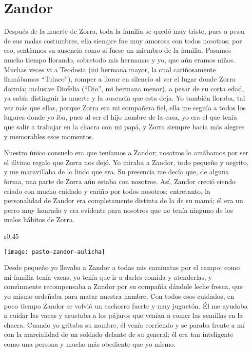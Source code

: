 \cleardoublepage
\newpage
\ifdefined\EnableIncludeImages
\fi
\chapter{Zandor}
Después de la muerte de Zorra, toda la familia se quedó muy triste, pues a pesar de sus malas costumbres, ella siempre fue muy amorosa con todos nosotros; por eso, sentíamos su ausencia como si fuese un miembro de la familia.
Pasamos mucho tiempo llorando, sobretodo mis hermanas y yo, que aún eramos niños.
Muchas veces vi a Teodosia (mi hermana mayor, la cual cariñosamente llamábamos ``Tulaco''), romper a llorar en silencio al ver el lugar donde Zorra dormía; inclusive Diofelia (``Dio'', mi hermana menor), a pesar de su corta edad, ya sabía distinguir la muerte y la ausencia que esta deja.
Yo también lloraba, tal vez más que ellas, porque Zorra era mi compañera fiel, ella me seguía a todos los lugares donde yo iba, pues al ser el hijo hombre de la casa, yo era el que tenía que salir a trabajar en la chacra con mi papá, y Zorra siempre hacía más alegres y memorables esos momentos.

Nuestro único consuelo era que teníamos a Zandor; nosotros lo amábamos por ser el último regalo que Zorra nos dejó.
Yo miraba a Zandor, todo pequeño y negrito, y me maravillaba de lo lindo que era. Su presencia me decía que, de alguna forma, una parte de Zorra aún estaba con nosotros.
Así, Zandor creció siendo criado con mucho cuidado y cariño por todos nosotros;
entretanto, la personalidad de Zandor era completamente distinta de la de su mamá; él era un perro muy honrado y era evidente para nosotros que no tenía ninguno de los malos hábitos de Zorra.
\ifdefined\EnableIncludeImages
\begin{wrapfigure}{r}{0.45\textwidth}
  \begin{center}
  \vspace{-20pt}
    \texttt{[image: pasto-zandor-aulicha]}
  \end{center}
  \vspace{-20pt}
\end{wrapfigure}
\fi
Desde pequeño yo llevaba a Zandor a todas mis caminatas por el campo; como mi familia tenía vacas, yo tenía que ir a darles comida y atenderlas, y comúnmente recompensaba a Zandor por su compañía dándole leche fresca, que yo mismo ordeñaba para matar nuestra hambre.
Con todos esos cuidados, en poco tiempo Zandor se volvió un cachorro fuerte y muy juguetón.
Él me ayudaba a cuidar las vacas y asustaba a los pájaros que venían a comer las semillas en la chacra. 
Cuando yo gritaba su nombre, él venía corriendo y se paraba frente a mí con la marcialidad de un soldado delante de su general; 
él era tan inteligente como una persona y mucho más obediente que yo mismo.

